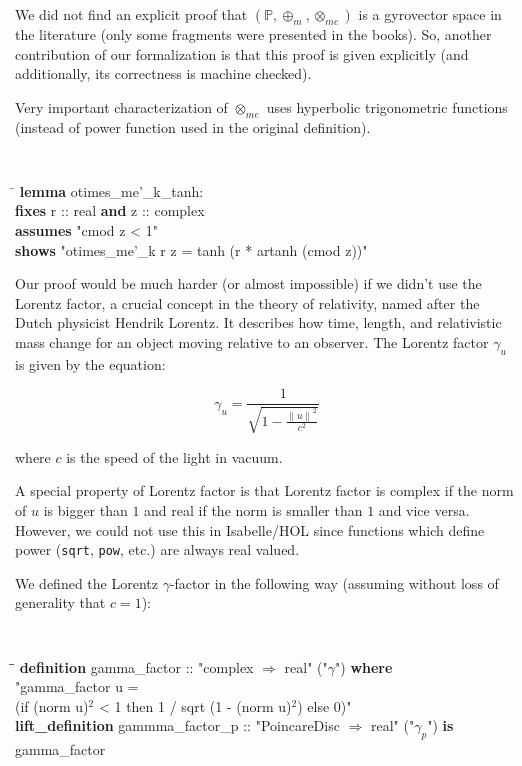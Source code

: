 \documentclass[a4paper]{article}
\newcommand{\tab}{\hspace{5mm}}
\theoremstyle{definition}
\newcommand{\norm}[1]{\left\lVert#1\right\rVert}
\begin{document}
We did not find an explicit proof that
$(\mathbb{P}, \oplus_m, \otimes_{me})$ is a gyrovector space in the
literature (only some fragments were presented in the
books\cite{ungar-analytic}). So, another contribution of our
formalization is that this proof is given explicitly (and
additionally, its correctness is machine checked).

Very important characterization of $\otimes_{me}$ uses hyperbolic
trigonometric functions (instead of power function used in the
original definition).

{\tt
\begin{small}
\begin{tabbing}
\hspace{5mm}\=\kill
{\bf lemma} otimes\_me'\_k\_tanh:\\
\>  {\bf fixes} r :: real {\bf and} z :: complex\\
\>  {\bf assumes} "cmod z < 1"\\
\>  {\bf shows} "otimes\_me'\_k r z = tanh (r * artanh (cmod z))"
\end{tabbing}
\end{small}
}


Our proof would be much harder (or almost impossible) if we didn't use
the Lorentz factor, a crucial concept in the theory of relativity,
named after the Dutch physicist Hendrik Lorentz. It describes how
time, length, and relativistic mass change for an object moving
relative to an observer. The Lorentz factor $\gamma_u$ is given by the
equation:

$$\gamma_u = \frac{1}{\sqrt{1-\frac{\norm{u}^2}{c^2}}}$$

\noindent where $c$ is the speed of the light in vacuum.

A special property of Lorentz factor is that Lorentz factor is complex
if the norm of $u$ is bigger than $1$ and real if the norm is smaller
than $1$ and vice versa. However, we could not use this in
Isabelle/HOL since functions which define power (\texttt{sqrt},
\texttt{pow}, etc.)  are always real valued.

We defined the Lorentz $\gamma$-factor in the following way (assuming
without loss of generality that $c=1$):


{\tt
\begin{small}
\begin{tabbing}
\tab\=\tab\=\kill
{\bf definition} gamma\_factor :: "complex $\Rightarrow$ real" ("$\gamma$") {\bf where}\\
\> "gamma\_factor u = \\
\>\> (if (norm u)$^2$ < 1 then  1 / sqrt (1 - (norm u)$^2$) else 0)"\\
{\bf lift\_definition} gammma\_factor\_p :: "PoincareDisc $\Rightarrow$ real" ("$\gamma_p$") {\bf is}\\
\> gamma\_factor
\end{tabbing}
\end{small}
\tt}
\end{document}
